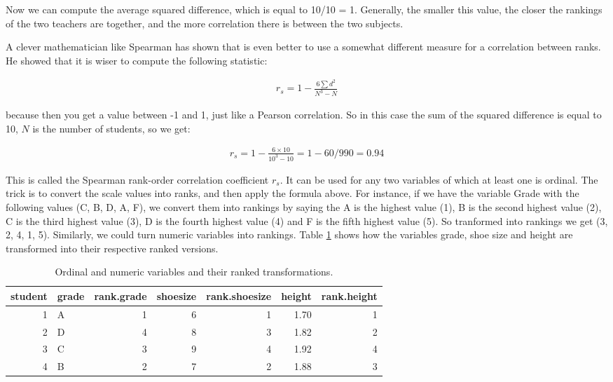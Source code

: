 \documentclass[]{report}\usepackage[]{graphicx}\usepackage[]{color}
\begin{document}
Now we can compute the average squared difference, which is equal to 10/10 = 1. Generally, the smaller this value, the closer the rankings of the two teachers are together, and the more correlation there is between the two subjects. 

A clever mathematician like Spearman has shown that is even better to use a somewhat different measure for a correlation between ranks. He showed that it is wiser to compute the following statistic:

\begin{eqnarray}
r_s = 1 - \frac{6 \sum d^2 }{N^3-N}
\end{eqnarray}

because then you get a value between -1 and 1, just like a Pearson correlation. So in this case the sum of the squared difference is equal to 10, $N$ is the number of students, so we get:


\begin{eqnarray}
r_s = 1 - \frac{6 \times 10  }{10^3-10} = 1 - 60 /990 = 0.94
\end{eqnarray}


This is called the Spearman rank-order correlation coefficient $r_s$. It can be used for any two variables of which at least one is ordinal. The trick is to convert the scale values into ranks, and then apply the formula above. For instance, if we have the variable Grade with the following values (C, B, D, A, F), we convert them into rankings by saying the A is the highest value (1), B is the second highest value (2), C is the third highest value (3), D is the fourth highest value (4) and F is the fifth highest value (5). So tranformed into rankings we get (3, 2, 4, 1, 5). Similarly, we could turn numeric variables into rankings. Table \ref{tab:nonpar_6} shows how the variables grade, shoe size and height are transformed into their respective ranked versions. 

\begin{table}[ht]
\centering
\caption{Ordinal and numeric variables and their ranked transformations.} 
\label{tab:nonpar_6}
\begin{tabular}{rlrrrrr}
  \hline
student & grade & rank.grade & shoesize & rank.shoesize & height & rank.height \\ 
  \hline
1 & A & 1 & 6 & 1 & 1.70 & 1 \\ 
  2 & D & 4 & 8 & 3 & 1.82 & 2 \\ 
  3 & C & 3 & 9 & 4 & 1.92 & 4 \\ 
  4 & B & 2 & 7 & 2 & 1.88 & 3 \\ 
   \hline
\end{tabular}
\end{table}
\end{document}
